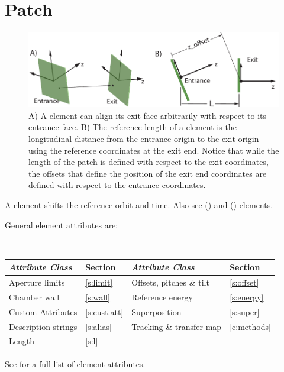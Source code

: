 {%
\section{Patch}
\label{s:patch}

\begin{figure}[tb]
  \centering
  \includegraphics[width=5in]{patch.pdf}
  \caption[Patch Element.]
{A) A  element can align its exit face arbitrarily with respect to its entrance
face. B) The reference length of a  element is the longitudinal distance from
the entrance origin to the exit origin using the reference coordinates at the exit
end. Notice that while the length of the patch is defined with respect to the exit
coordinates, the offsets that define the position of the exit end coordinates are defined
with respect to the entrance coordinates.
}
  \label{f:patch}
\end{figure}


A  element shifts the reference orbit and time. Also see
 () and 
() elements.

General  element attributes are:
\begin{center}
\tt
\begin{tabular}{llll} \toprule
  {\sl Attribute Class}      & Section           & {\sl Attribute Class}      & Section         \\ \midrule
  Aperture limits            & \ref{s:limit}     & Offsets, pitches \& tilt   & \ref{s:offset}  \\ 
  Chamber wall               & \ref{s:wall}      & Reference energy           & \ref{s:energy}  \\
  Custom Attributes          & \ref{s:cust.att}  & Superposition              & \ref{s:super}   \\
  Description strings        & \ref{s:alias}     & Tracking \& transfer map   & \ref{c:methods} \\
  Length                     & \ref{s:l}         &                            &                 \\
  \bottomrule
\end{tabular}
\end{center}
\toffset
See  for a full list of element attributes.

}
